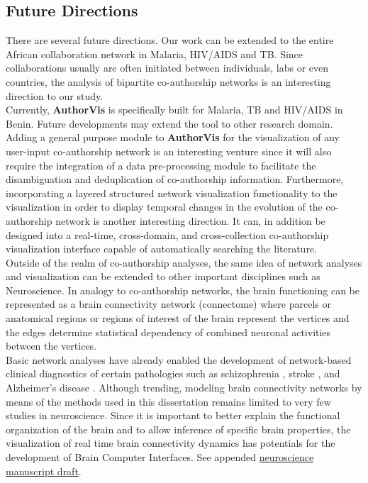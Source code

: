 \subsection*{Future Directions}
There are several future directions. Our work can be extended to the entire African collaboration network in Malaria, HIV/AIDS and TB. Since collaborations usually are often initiated between individuals, labs or even countries, the analysis of bipartite co-authorship networks is an interesting direction to our study. \\
Currently, \textbf{AuthorVis} is specifically built for Malaria, TB and HIV/AIDS in Benin. Future developments may extend the tool to other research domain. Adding a general purpose module to \textbf{AuthorVis} for the visualization of any user-input co-authorship network is an interesting venture since it will also require the integration of a data pre-processing module to facilitate the disambiguation and deduplication of co-authorship information. Furthermore, incorporating a layered structured network visualization \cite{nakazono_nel_2006} functionality to the visualization in order to display temporal changes in the evolution of the co-authorship network is another interesting direction. It can, in addition be designed into a real-time, cross-domain, and cross-collection co-authorship visualization interface capable of automatically searching the literature. \\
Outside of the realm of co-authorship analyses, the same idea of network analyses and visualization can be extended to other important disciplines such as Neuroscience. In analogy to co-authorship networks, the brain functioning can be represented as a brain connectivity network (connectome) where parcels or anatomical regions or regions of interest of the brain represent the vertices and the edges determine statistical dependency of combined neuronal activities between the vertices. \\
Basic network analyses have already enabled the development of network-based clinical diagnostics of certain pathologies such as schizophrenia \citep{LynallFunctionalConnectivityBrain2010}, stroke \citep{GrefkesReorganizationcerebralnetworks2011}, and Alzheimer’s disease \citep{TijmsAlzheimerdiseaseconnecting2013}. Although trending, modeling brain connectivity networks by means of the methods used in this dissertation remains limited to very few studies  \citep{SimpsonExponentialRandomGraph2011,Forerostatisticalmodelbrain2017,ForeroGraphModelsBrain2015,DeVicoFallaniGraphanalysisfunctional2014,WangExponentialrandomgraph2013,SinkeBayesianexponentialrandom2016} in neuroscience. Since it is important to better explain the functional organization of the brain and to allow inference of specific brain properties, the visualization of real time brain connectivity dynamics has potentials for the development of Brain Computer Interfaces. See appended \hyperlink{app:draft}{neuroscience manuscript draft}. %
